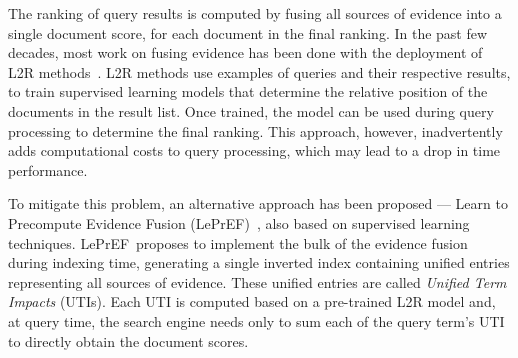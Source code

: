 \documentclass[preprint,review,10pt,3p]{elsarticle}
\begin{document}

The ranking of query results is computed by fusing all sources of evidence into a single document score, for each document in the final ranking. In the past few decades, most work on fusing evidence has been done with the deployment of L2R methods~\cite{liu11:L2RfIR}.
L2R methods use examples of queries and their respective results, to train supervised learning models that determine the relative position of the documents in the result list. Once trained, the model can be used during query processing to determine the final ranking. This approach, however, inadvertently adds computational costs to query processing, which may lead to a drop in time performance.


\newcommand{\lepref}{LePrEF}
\newcommand{\lambdamart}{LambdaMART}

To mitigate this problem, an alternative approach has been proposed --- Learn to Precompute Evidence Fusion (\lepref)~\cite{costa2012lepref}, also based on supervised learning techniques. \lepref\ proposes to implement the bulk of the evidence fusion during indexing time, generating a single inverted index containing unified entries representing all sources of evidence. These unified entries are called \textit{Unified Term Impacts} (UTIs). 
Each UTI is computed based on a pre-trained L2R model and, at query time, the search engine needs only to sum each of the query term's UTI to directly obtain the document scores.
\end{document}
